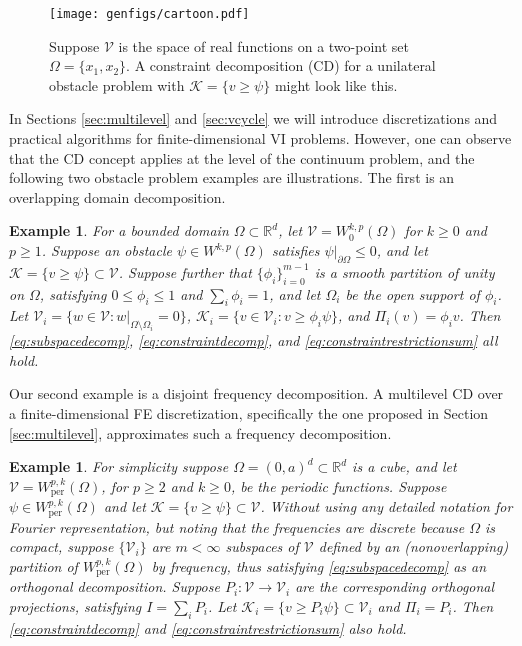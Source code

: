 \documentclass[letterpaper,final,12pt,reqno]{amsart}
\theoremstyle{cstyle}
\theoremstyle{cstyle*}
\theoremstyle{dstyle}
\newtheorem{example}[theorem]{Example}
\numberwithin{equation}{section}
\numberwithin{figure}{section}
\numberwithin{table}{section}
\numberwithin{theorem}{section}
\newcommand{\RR}{\mathbb{R}}
\newcommand{\cK}{\mathcal{K}}
\newcommand{\cV}{\mathcal{V}}
\begin{document}
\begin{figure}[ht]
\texttt{[image: genfigs/cartoon.pdf]}
\caption{Suppose $\mathcal{V}$ is the space of real functions on a two-point set $\Omega=\{x_1,x_2\}$.  A constraint decomposition (CD) for a unilateral obstacle problem with $\mathcal{K}=\{v\ge \psi\}$ might look like this.}
\label{fig:cartoon}
\end{figure}

In Sections \ref{sec:multilevel} and \ref{sec:vcycle} we will introduce discretizations and practical algorithms for finite-dimensional VI problems.  However, one can observe that the CD concept applies at the level of the continuum problem, and the following two obstacle problem examples are illustrations.  The first is an overlapping domain decomposition.

\begin{example}  \label{ex:domaindecomposition}  For a bounded domain $\Omega \subset \RR^d$, let $\cV = W_0^{k,p}(\Omega)$ for $k\ge 0$ and $p\ge 1$.  Suppose an obstacle $\psi \in W^{k,p}(\Omega)$ satisfies $\psi|_{\partial \Omega} \le 0$, and let $\cK = \{v \ge \psi\} \subset \cV$.  Suppose further that $\{\phi_i\}_{i=0}^{m-1}$ is a smooth partition of unity on $\Omega$, satisfying $0 \le \phi_i\le 1$ and $\sum_i \phi_i = 1$, and let $\Omega_i$ be the open support of $\phi_i$.  Let $\cV_i = \{w \in \cV:w|_{\Omega \setminus \Omega_i} =0 \}$, $\cK_i = \{v \in \cV_i: v \ge \phi_i \psi\}$, and $\Pi_i(v) = \phi_i v$.  Then \eqref{eq:subspacedecomp}, \eqref{eq:constraintdecomp}, and \eqref{eq:constraintrestrictionsum} all hold.
\end{example}

Our second example is a disjoint frequency decomposition.  A multilevel CD over a finite-dimensional FE discretization, specifically the one proposed in Section \ref{sec:multilevel}, approximates such a frequency decomposition.

\begin{example}  \label{ex:frequencydecomposition}  For simplicity suppose $\Omega = (0,a)^d \subset \RR^d$ is a cube, and let $\cV = W_{\text{per}}^{p,k}(\Omega)$, for $p\ge 2$ and $k\ge 0$, be the periodic functions.  Suppose $\psi \in W_{\text{per}}^{p,k}(\Omega)$ and let $\cK = \{v \ge \psi\} \subset \cV$.  Without using any detailed notation for Fourier representation, but noting that the frequencies are discrete because $\Omega$ is compact, suppose $\{\cV_i\}$ are $m<\infty$ subspaces of $\cV$ defined by an (nonoverlapping) partition of $W_{\text{per}}^{p,k}(\Omega)$ by frequency, thus satisfying \eqref{eq:subspacedecomp} as an orthogonal decomposition.  Suppose $P_i:\cV \to \cV_i$ are the corresponding orthogonal projections, satisfying $I = \sum_i P_i$.  Let $\cK_i = \{v \ge P_i \psi\} \subset \cV_i$ and $\Pi_i = P_i$.  Then \eqref{eq:constraintdecomp} and \eqref{eq:constraintrestrictionsum} also hold.
\end{example}
\end{document}
